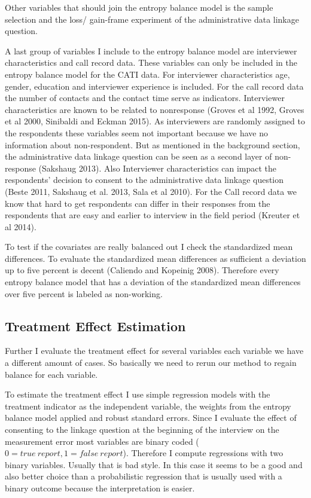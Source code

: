 Other variables that should join the entropy balance model is the sample selection and the loss/ gain-frame experiment of the administrative data linkage question. 

A last group of variables I include to the entropy balance model are interviewer characteristics and call record data. These variables can only be included in the entropy balance model for the CATI data. For interviewer characteristics age, gender, education and interviewer experience is included. For the call record data the number of contacts and the contact time serve as indicators. Interviewer characteristics are known to be related to nonresponse (Groves et al 1992, Groves et al 2000, Sinibaldi and Eckman 2015). As interviewers are randomly assigned to the respondents these variables seem not important because we have no information about non-respondent. But as mentioned in the background section, the administrative data linkage question can be seen as a second layer of non-response (Sakshaug 2013). Also Interviewer characteristics can impact the respondents' decision to consent to the administrative data linkage question (Beste 2011, Sakshaug et al. 2013, Sala et al 2010). For the Call record data we know that hard to get respondents can differ in their responses from the respondents that are easy and earlier to interview in the field period (Kreuter et al 2014).

To test if the covariates are really balanced out I check the standardized mean differences. To evaluate the standardized mean differences as sufficient a deviation up to five percent is decent (Caliendo and Kopeinig 2008). Therefore every entropy balance model that has a deviation of the standardized mean differences over five percent is labeled as non-working. 

\subsection{Treatment Effect Estimation}

Further I evaluate the treatment effect for several variables each variable we have a different amount of cases. So basically we need to rerun our method to regain balance for each variable.

To estimate the treatment effect I use simple regression models with the treatment indicator as the independent variable, the weights from the entropy balance model applied and robust standard errors. Since I evaluate the effect of consenting to the linkage question at the beginning of the interview on the measurement error most variables are binary coded  (\(0=true\ report, 1=false \ report\)). Therefore I compute regressions with two binary variables. Usually that is bad style. In this case it seems to be a good and also better choice than a probabilistic regression that is usually used with a binary outcome because the interpretation is easier. 

